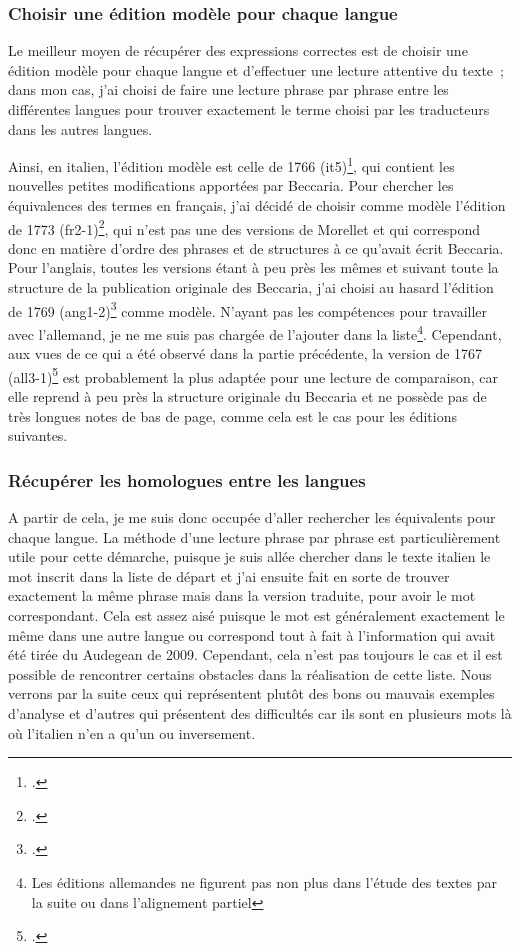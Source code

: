 \subsubsection{Choisir une édition modèle pour chaque langue}
Le meilleur moyen de récupérer des expressions correctes est de choisir une édition modèle pour chaque langue et d'effectuer une lecture attentive du texte~; dans mon cas, j'ai choisi de faire une lecture phrase par phrase entre les différentes langues pour trouver exactement le terme choisi par les traducteurs dans les autres langues.

Ainsi, en italien, l'édition modèle est celle de 1766 (it5)\footcite{it5}, qui contient les nouvelles petites modifications apportées par Beccaria. Pour chercher les équivalences des termes en français, j'ai décidé de choisir comme modèle l'édition de 1773 (fr2-1)\footcite{fr2-1}, qui n'est pas une des versions de Morellet et qui correspond donc en matière d'ordre des phrases et de structures à ce qu'avait écrit Beccaria. Pour l'anglais, toutes les versions étant à peu près les mêmes et suivant toute la structure de la publication originale des Beccaria, j'ai choisi au hasard l'édition de 1769 (ang1-2)\footcite{ang1-2} comme modèle. N'ayant pas les compétences pour travailler avec l'allemand, je ne me suis pas chargée de l'ajouter dans la liste\footnote{Les éditions allemandes ne figurent pas non plus dans l'étude des textes par la suite ou dans l'alignement partiel}. Cependant, aux vues de ce qui a été observé dans la partie précédente, la version de 1767 (all3-1)\footcite{all3-1} est probablement la plus adaptée pour une lecture de comparaison, car elle reprend à peu près la structure originale du Beccaria et ne possède pas de très longues notes de bas de page, comme cela est le cas pour les éditions suivantes.

\subsubsection{Récupérer les homologues entre les langues}
A partir de cela, je me suis donc occupée d'aller rechercher les équivalents pour chaque langue. La méthode d'une lecture phrase par phrase est particulièrement utile pour cette démarche, puisque je suis allée chercher dans le texte italien le mot inscrit dans la liste de départ et j'ai ensuite fait en sorte de trouver exactement la même phrase mais dans la version traduite, pour avoir le mot correspondant. Cela est assez aisé puisque le mot est généralement exactement le même dans une autre langue ou correspond tout à fait à l'information qui avait été tirée du Audegean de 2009. Cependant, cela n'est pas toujours le cas et il est possible de rencontrer certains obstacles dans la réalisation de cette liste. Nous verrons par la suite ceux qui représentent plutôt des bons ou mauvais exemples d'analyse et d'autres qui présentent des difficultés car ils sont en plusieurs mots là où l'italien n'en a qu'un ou inversement. 

